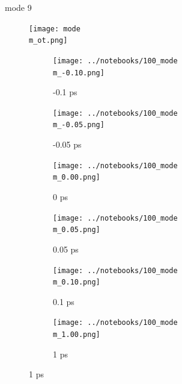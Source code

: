 \documentclass{beamer}
\begin{document}
\renewcommand\m{9}
\begin{frame}{mode \m}
	\vspace{\vh mm}
\begin{figure}
	\centering
	\texttt{[image: mode\\m\_ot.png]}
\end{figure}
	\begin{figure}
		\centering
		\begin{subfigure}[b]{\w\textwidth}
			\centering
			\texttt{[image: ../notebooks/100\_mode\\m\_-0.10.png]}
			\caption{-0.1 ps}
		\end{subfigure}
		\begin{subfigure}[b]{\w\textwidth}
			\centering
			\texttt{[image: ../notebooks/100\_mode\\m\_-0.05.png]}
			\caption{-0.05 ps}
		\end{subfigure}
		\begin{subfigure}[b]{\w\textwidth}
			\centering
			\texttt{[image: ../notebooks/100\_mode\\m\_0.00.png]}
			\caption{0 ps}
		\end{subfigure}
		\begin{subfigure}[b]{\w\textwidth}
			\centering
			\texttt{[image: ../notebooks/100\_mode\\m\_0.05.png]}
			\caption{0.05 ps}
		\end{subfigure}
		\begin{subfigure}[b]{\w\textwidth}
			\centering
			\texttt{[image: ../notebooks/100\_mode\\m\_0.10.png]}
			\caption{0.1 ps}
		\end{subfigure}
		\begin{subfigure}[b]{\w\textwidth}
			\centering
			\texttt{[image: ../notebooks/100\_mode\\m\_1.00.png]}
			\caption{1 ps}
		\end{subfigure}
	\end{figure}
\end{frame}
\end{document}
